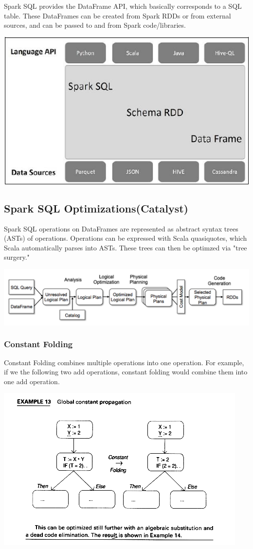 \documentclass[twoside]{article}
\begin{document}
Spark SQL provides the DataFrame API, which basically corresponds to a SQL table. These DataFrames can be created from Spark RDDs or from external sources, and can be passed to and from Spark code/libraries. 

\includegraphics{spark_sql_architecture.jpg}

\subsection{Spark SQL Optimizations(Catalyst)}
Spark SQL operations on DataFrames are represented as abstract syntax trees (ASTs) of operations. Operations can be expressed with Scala quasiquotes, which Scala automatically parses into ASTs. These trees can then be optimzed via "tree surgery."

\includegraphics{Screen-Shot-2015-04-12-at-8_41_26-AM.png}

\subsubsection{Constant Folding}
Constant Folding combines multiple operations into one operation. For example, if we the following two add operations, constant folding would combine them into one add operation.

\includegraphics{pg203x13.png}
\end{document}
